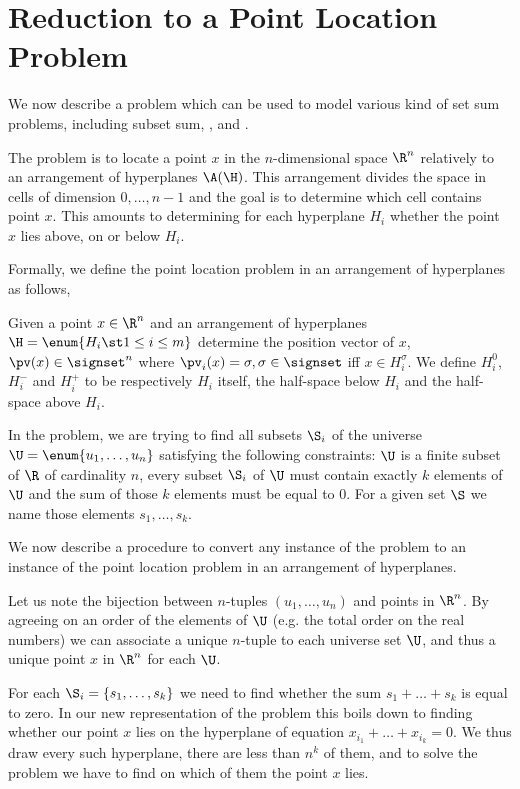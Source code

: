 \section{Reduction to a Point Location Problem}

We now describe a problem which can be used to model
various kind of set sum problems, including subset sum, \kSUM, and \kLDT.

The problem is to locate a point \(x\) in the \(n\)-dimensional space \(\R^n\) relatively
to an arrangement of hyperplanes \(\A(\H)\). This arrangement divides the space
in cells of dimension \(0,\ldots,n-1\) and the goal is to determine which
cell contains point \(x\). This amounts to determining for each
hyperplane \(H_i\) whether the point \(x\) lies above, on or below \(H_i\).

Formally, we define the point location problem in an arrangement of hyperplanes as
follows,

\begin{problem}
Given a point $x \in \R^n$ and an arrangement of hyperplanes $\H = \enum{ H_i
\st 1 \leq i \leq m }$ determine the position vector of $x$, $\pv(x) \in
\signset^n$ where $\pv_i(x) = \sigma, \sigma \in \signset$ iff $x \in
H_i^{\sigma}$. We define $H_i^{0}$, $H_i^{-}$ and $H_i^{+}$ to be
respectively $H_i$ itself, the half-space below $H_i$ and the half-space above
$H_i$.
\end{problem}

In the \kSUM problem, we are trying to find all subsets \(\S_i\) of the
universe \(\U = \enum{u_1,\ldots,u_n}\) satisfying the following constraints:
\(\U\) is a finite subset of \(\R\) of cardinality \(n\), every subset $\S_i$
of $\U$ must contain exactly $k$ elements of $\U$ and the sum of those $k$
elements must be equal to $0$. For a given set $\S$ we name those elements
$s_1, \dots, s_k$.

We now describe a procedure to convert any instance of the \kSUM problem to an
instance of the point location problem in an arrangement of hyperplanes.

Let us note the bijection between $n$-tuples $(u_1, \ldots, u_n)$ and points in
$\R^n$. By agreeing on an order of the elements of $\U$ (e.g. the total order on
the real numbers) we can associate a unique $n$-tuple to each universe set $\U$,
and thus a unique point $x$ in $\R^n$ for each $\U$.

For each $\S_i = \left\{s_1, \dots, s_k\right\}$ we need to find whether the sum $s_1
+ \dots + s_k$ is equal to zero. In our new representation of the problem this
boils down to finding whether our point $x$ lies on the hyperplane of
equation $x_{i_1} + \dots + x_{i_k} = 0$. We thus draw every such hyperplane,
there are less than $n^k$ of them, and to solve the problem
we have to find on which of them the point $x$ lies.

